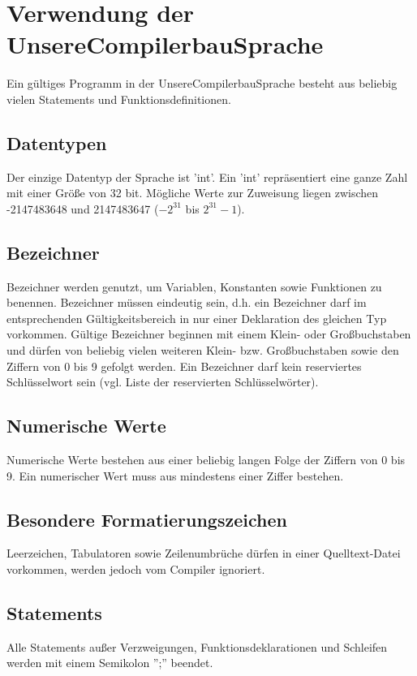 
\section{Verwendung der UnsereCompilerbauSprache}
\label{sec:verwendung}
Ein gültiges Programm in der UnsereCompilerbauSprache besteht aus beliebig vielen Statements und Funktionsdefinitionen. 

\subsection{Datentypen}
Der einzige Datentyp der Sprache ist 'int'. Ein 'int' repräsentiert eine ganze Zahl mit einer Größe von 32 bit. Mögliche Werte zur Zuweisung liegen zwischen -2147483648 und 2147483647 ($-2^{31}$ bis $2^{31} - 1$).

\subsection{Bezeichner}
Bezeichner werden genutzt, um Variablen, Konstanten sowie Funktionen zu benennen.
Bezeichner müssen eindeutig sein, d.h. ein Bezeichner darf im entsprechenden Gültigkeitsbereich in nur einer Deklaration des gleichen Typ vorkommen. Gültige Bezeichner beginnen mit einem Klein- oder Großbuchstaben und dürfen von beliebig vielen weiteren Klein- bzw. Großbuchstaben sowie den Ziffern von 0 bis 9 gefolgt werden. Ein Bezeichner darf kein reserviertes Schlüsselwort sein (vgl. Liste der reservierten Schlüsselwörter).

\subsection{Numerische Werte}
Numerische Werte bestehen aus einer beliebig langen Folge der Ziffern von 0 bis 9. Ein numerischer Wert muss aus mindestens einer Ziffer bestehen.

\subsection{Besondere Formatierungszeichen} 
Leerzeichen, Tabulatoren sowie Zeilenumbrüche dürfen in einer Quelltext-Datei vorkommen, werden jedoch vom Compiler ignoriert.

\subsection{Statements}
Alle Statements außer Verzweigungen, Funktionsdeklarationen und Schleifen werden mit einem Semikolon '';'' beendet.

